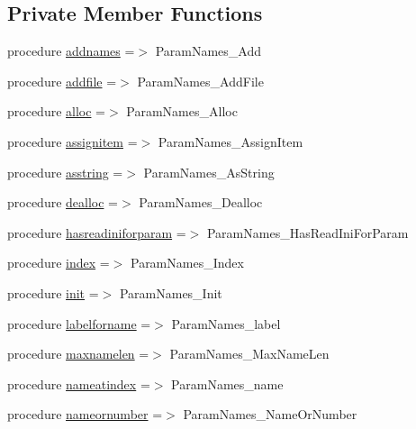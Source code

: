\subsection*{Private Member Functions}
\begin{DoxyCompactItemize}
\item 
procedure \mbox{\hyperlink{structparamnames_1_1tparamnames_aa9aae9e967c909d4a545015fe459edec}{addnames}} =$>$ Param\+Names\+\_\+\+Add
\item 
procedure \mbox{\hyperlink{structparamnames_1_1tparamnames_a50c467272444f5e6860380de898394e2}{addfile}} =$>$ Param\+Names\+\_\+\+Add\+File
\item 
procedure \mbox{\hyperlink{structparamnames_1_1tparamnames_a6257648c9b215c00b0b6a25ddf8358a8}{alloc}} =$>$ Param\+Names\+\_\+\+Alloc
\item 
procedure \mbox{\hyperlink{structparamnames_1_1tparamnames_a63b74524b9eec68b2943f771a2d5ad73}{assignitem}} =$>$ Param\+Names\+\_\+\+Assign\+Item
\item 
procedure \mbox{\hyperlink{structparamnames_1_1tparamnames_af75d95be55e78b78ea5092b3701bb94f}{asstring}} =$>$ Param\+Names\+\_\+\+As\+String
\item 
procedure \mbox{\hyperlink{structparamnames_1_1tparamnames_add3837f483e64b153300cacbc9da10b6}{dealloc}} =$>$ Param\+Names\+\_\+\+Dealloc
\item 
procedure \mbox{\hyperlink{structparamnames_1_1tparamnames_a3a6debd619ecc174df6557ba774591da}{hasreadiniforparam}} =$>$ Param\+Names\+\_\+\+Has\+Read\+Ini\+For\+Param
\item 
procedure \mbox{\hyperlink{structparamnames_1_1tparamnames_a6b5202a51134d0a57a69e7acf298aad8}{index}} =$>$ Param\+Names\+\_\+\+Index
\item 
procedure \mbox{\hyperlink{structparamnames_1_1tparamnames_a03013b41b712a12e2929fec5b8fcc5e9}{init}} =$>$ Param\+Names\+\_\+\+Init
\item 
procedure \mbox{\hyperlink{structparamnames_1_1tparamnames_ad3112fa19a040d4380e9b7cd5ae257d5}{labelforname}} =$>$ Param\+Names\+\_\+label
\item 
procedure \mbox{\hyperlink{structparamnames_1_1tparamnames_ae1308925fa307ed72dac175c6bcd63a7}{maxnamelen}} =$>$ Param\+Names\+\_\+\+Max\+Name\+Len
\item 
procedure \mbox{\hyperlink{structparamnames_1_1tparamnames_a57567d471fd27653ab66bad583fd2baf}{nameatindex}} =$>$ Param\+Names\+\_\+name
\item 
procedure \mbox{\hyperlink{structparamnames_1_1tparamnames_ab360da71ed6d2104979e9c1bcfff51e3}{nameornumber}} =$>$ Param\+Names\+\_\+\+Name\+Or\+Number

\end{DoxyCompactItemize}
